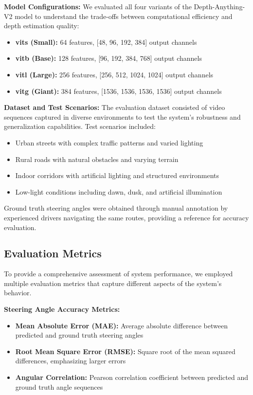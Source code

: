 \documentclass[conference]{IEEEtran}
\begin{document}
\textbf{Model Configurations:}
We evaluated all four variants of the Depth-Anything-V2 model to understand the trade-offs between computational efficiency and depth estimation quality:
\begin{itemize}
\item \textbf{vits (Small):} 64 features, [48, 96, 192, 384] output channels
\item \textbf{vitb (Base):} 128 features, [96, 192, 384, 768] output channels
\item \textbf{vitl (Large):} 256 features, [256, 512, 1024, 1024] output channels
\item \textbf{vitg (Giant):} 384 features, [1536, 1536, 1536, 1536] output channels
\end{itemize}

\textbf{Dataset and Test Scenarios:}
The evaluation dataset consisted of video sequences captured in diverse environments to test the system's robustness and generalization capabilities. Test scenarios included:
\begin{itemize}
\item Urban streets with complex traffic patterns and varied lighting
\item Rural roads with natural obstacles and varying terrain
\item Indoor corridors with artificial lighting and structured environments
\item Low-light conditions including dawn, dusk, and artificial illumination
\end{itemize}

Ground truth steering angles were obtained through manual annotation by experienced drivers navigating the same routes, providing a reference for accuracy evaluation.

\subsection{Evaluation Metrics}
To provide a comprehensive assessment of system performance, we employed multiple evaluation metrics that capture different aspects of the system's behavior.

\textbf{Steering Angle Accuracy Metrics:}
\begin{itemize}
\item \textbf{Mean Absolute Error (MAE):} Average absolute difference between predicted and ground truth steering angles
\item \textbf{Root Mean Square Error (RMSE):} Square root of the mean squared differences, emphasizing larger errors
\item \textbf{Angular Correlation:} Pearson correlation coefficient between predicted and ground truth angle sequences
\end{itemize}
\end{document}
